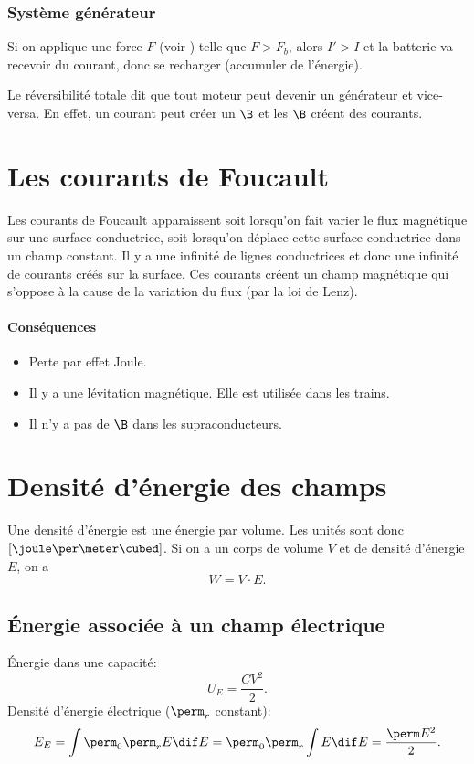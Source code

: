 \subsubsection{Système générateur}
Si on applique une force $F$ (voir ) telle que $F > F_b$,
alors $I' > I$ et la batterie va recevoir du courant,
donc se recharger (accumuler de l'énergie).

Le réversibilité totale dit que tout moteur %
peut devenir un générateur et vice-versa.
En effet, un courant peut créer un $\B$ et les $\B$ créent des courants.

\section{Les courants de Foucault}
Les courants de Foucault apparaissent soit lorsqu'on
fait varier le flux magnétique sur une surface conductrice, soit
lorsqu'on déplace cette surface conductrice dans un champ constant.
Il y a une infinité de lignes conductrices et
donc une infinité de courants créés sur la surface.
Ces courants créent un champ magnétique qui s'oppose à la cause
de la variation du flux (par la loi de Lenz).

\paragraph{Conséquences}
\begin{itemize}
  \item Perte par effet Joule.
  \item Il y a une lévitation magnétique. Elle est utilisée dans les trains.
  \item Il n'y a pas de $\B$ dans les supraconducteurs.
\end{itemize}

\section{Densité d'énergie des champs}
Une densité d'énergie est une énergie par volume.
Les unités sont donc $[\joule\per\meter\cubed]$.
Si on a un corps de volume $V$ et de densité d'énergie $E$, on a
\[ W = V \cdot E. \]

\subsection{Énergie associée à un champ électrique}
Énergie dans une capacité:
\[ U_E = \frac{CV^2}{2}. \]
Densité d'énergie électrique ($\perm_r$ constant):
\[ E_E = \int \perm_0 \perm_r E \dif E =
\perm_0 \perm_r \int E \dif E = \frac{\perm E^2}{2}. \]

